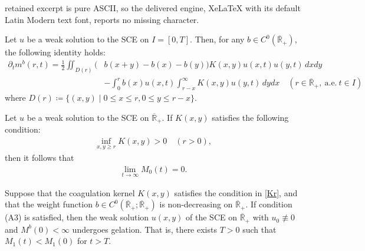 \documentclass[10pt,a4paper]{amsart}
\def\Rb{\overline{{\mathbb R}}_+}
\begin{document}
retained excerpt is pure ASCII, so the delivered engine, XeLaTeX with its default Latin Modern text font, reports no missing character.
\begin{thm} \label{TMI}
Let $u$ be a weak solution to the SCE on $I=[0,T]$.
Then, for any $b\in C^0(\Rb )$,
the following identity holds:
\begin{align*}
\partial_t m^b (r,t) = \frac{1}{2}\iint_{D(r)} \big(&b(x+y)-b(x)-b(y)\big)K(x,y)u(x,t)u(y,t)\,dxdy \\
&-\int^r_0 b(x)u(x,t)\int^\infty_{r-x} K(x,y)u(y,t)\,dydx\quad(r\in \Rb,~\text{a.e.}~t\in  I)
\end{align*}
where $D(r) \coloneqq \{(x,y)\mid0 \leq x \leq r, 0\leq y \leq r-x\}$.
\end{thm}

\begin{thm}\label{M0inf}
Let $u$ be a weak solution to the SCE on $\Rb$.
If $K(x,y)$ satisfies the following condition:
\begin{align}\label{Kr}
\inf_{x,y\geq r}K(x,y) >0\quad (r>0),
\end{align}
then it follows that
\begin{align}\label{limM0}
\lim_{t\to\infty}M_0(t)=0.
\end{align}
\end{thm}

\begin{thm}\label{mainth}
Suppose that the coagulation kernel $K(x,y)$ satisfies the condition in \eqref{Kr}, and that the weight function $b\in C^0(\Rb;\Rb)$ is non-decreasing on $\Rb$. If condition (A3) is satisfied, then the weak solution $u(x,y)$ of the SCE on $\Rb$ with $u_0\not\equiv 0$ and $M^b(0)<\infty$ undergoes gelation. That is, there exists $T>0$ such that $M_1(t)<M_1(0)$ for $t>T$. 
\end{thm}
\end{document}
